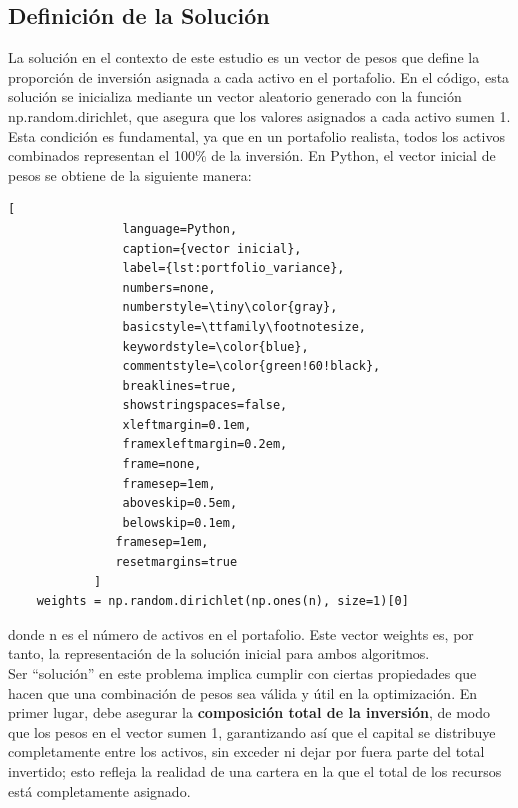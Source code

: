 \documentclass[9pt,a4paper,twoside]{rho-class/rho}
\begin{document}
        \subsection{Definición de la Solución}
            La solución en el contexto de este estudio es un vector de pesos que define la proporción de inversión asignada a cada activo en el portafolio. En el código, esta solución se inicializa mediante un vector aleatorio generado con la función np.random.dirichlet, que asegura que los valores asignados a cada activo sumen 1. Esta condición es fundamental, ya que en un portafolio realista, todos los activos combinados representan el 100\% de la inversión.
            En Python, el vector inicial de pesos se obtiene de la siguiente manera:

            \begin{lstlisting}[
                language=Python,
                caption={vector inicial},
                label={lst:portfolio_variance},
                numbers=none,
                numberstyle=\tiny\color{gray},
                basicstyle=\ttfamily\footnotesize,
                keywordstyle=\color{blue},
                commentstyle=\color{green!60!black},
                breaklines=true,
                showstringspaces=false,
                xleftmargin=0.1em,
                framexleftmargin=0.2em,
                frame=none,
                framesep=1em,
                aboveskip=0.5em,
                belowskip=0.1em,
               framesep=1em,
               resetmargins=true
            ]
    weights = np.random.dirichlet(np.ones(n), size=1)[0]
            \end{lstlisting}
            donde n es el número de activos en el portafolio. Este vector weights es, por tanto, la representación de la solución inicial para ambos algoritmos.\\
            Ser ``solución'' en este problema implica cumplir con ciertas propiedades que hacen que una combinación de pesos sea válida y útil en la optimización. En primer lugar, debe asegurar la \textbf{composición total de la inversión}, de modo que los pesos en el vector sumen 1, garantizando así que el capital se distribuye completamente entre los activos, sin exceder ni dejar por fuera parte del total invertido; esto refleja la realidad de una cartera en la que el total de los recursos está completamente asignado.
\end{document}
